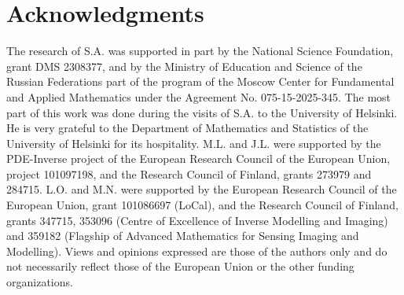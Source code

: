 \documentclass[11pt]{amsart}
\theoremstyle{definition}
\theoremstyle{plain}
\numberwithin{equation}{section}
\begin{document}
\section{Acknowledgments}
The research of S.A. was  supported  in part by the National Science Foundation, grant DMS 2308377, and by the Ministry of Education and Science of the Russian Federations part of the program of the Moscow Center for Fundamental and Applied Mathematics under the Agreement No. 075-15-2025-345. The most part of this work was done during the visits of S.A. to the University of Helsinki. He is very grateful to the Department of Mathematics and Statistics of the University of Helsinki for its hospitality.
M.L. and J.L. were supported by the PDE-Inverse project of the European Research Council of the European Union, project 
101097198, and the Research Council of Finland, grants 273979 and 284715. L.O. and M.N. were supported by the European Research Council of the European Union, grant 101086697 (LoCal), and the Research Council of Finland, grants 347715, 353096 (Centre of Excellence of Inverse Modelling and Imaging) and 359182 (Flagship of Advanced Mathematics for Sensing Imaging and Modelling). Views and opinions expressed are those of the authors only and do not necessarily reflect those of the European Union or the other funding organizations.
\end{document}
